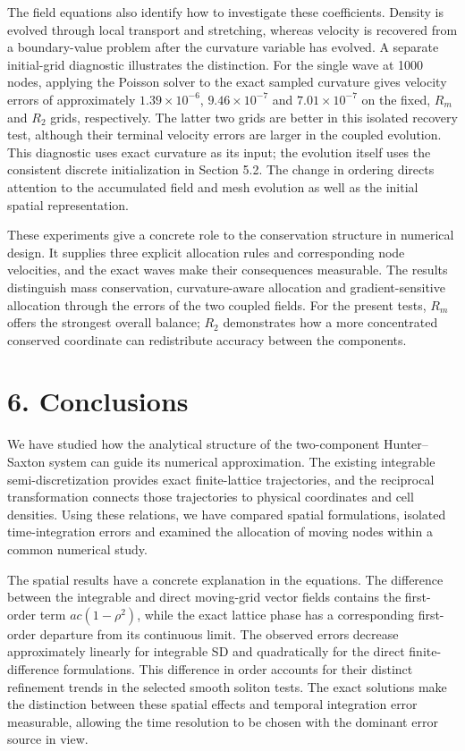 \documentclass[11pt,a4paper]{article}
\begin{document}
The field equations also identify how to investigate these coefficients. Density is evolved through local transport and stretching, whereas velocity is recovered from a boundary-value problem after the curvature variable has evolved. A separate initial-grid diagnostic illustrates the distinction. For the single wave at 1000 nodes, applying the Poisson solver to the exact sampled curvature gives velocity errors of approximately \(1.39\times10^{-6}\), \(9.46\times10^{-7}\) and \(7.01\times10^{-7}\) on the fixed, \(R_m\) and \(R_2\) grids, respectively. The latter two grids are better in this isolated recovery test, although their terminal velocity errors are larger in the coupled evolution. This diagnostic uses exact curvature as its input; the evolution itself uses the consistent discrete initialization in Section 5.2. The change in ordering directs attention to the accumulated field and mesh evolution as well as the initial spatial representation.

These experiments give a concrete role to the conservation structure in numerical design. It supplies three explicit allocation rules and corresponding node velocities, and the exact waves make their consequences measurable. The results distinguish mass conservation, curvature-aware allocation and gradient-sensitive allocation through the errors of the two coupled fields. For the present tests, \(R_m\) offers the strongest overall balance; \(R_2\) demonstrates how a more concentrated conserved coordinate can redistribute accuracy between the components.

\FloatBarrier
\section*{6. Conclusions}

We have studied how the analytical structure of the two-component Hunter–Saxton system can guide its numerical approximation. The existing integrable semi-discretization provides exact finite-lattice trajectories, and the reciprocal transformation connects those trajectories to physical coordinates and cell densities. Using these relations, we have compared spatial formulations, isolated time-integration errors and examined the allocation of moving nodes within a common numerical study.

The spatial results have a concrete explanation in the equations. The difference between the integrable and direct moving-grid vector fields contains the first-order term \(ac(1-\rho^2)\), while the exact lattice phase has a corresponding first-order departure from its continuous limit. The observed errors decrease approximately linearly for integrable SD and quadratically for the direct finite-difference formulations. This difference in order accounts for their distinct refinement trends in the selected smooth soliton tests. The exact solutions make the distinction between these spatial effects and temporal integration error measurable, allowing the time resolution to be chosen with the dominant error source in view.
\end{document}
